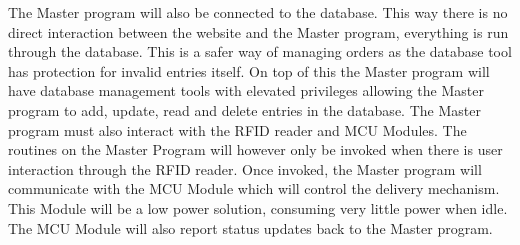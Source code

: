 \documentclass[a4paper,11pt]{article}
\numberwithin{figure}{section}
\numberwithin{table}{section}
\begin{document}
The Master program will also be connected to the database. This way there is no direct interaction between the website and the Master program, everything is run through the database. This is a safer way of managing orders as the database tool has protection for invalid entries itself. On top of this the Master program will have database management tools with elevated privileges allowing the Master program to add, update, read and delete entries in the database. The Master program must also interact with the RFID reader and MCU Modules. The routines on the Master Program will however only be invoked when there is user interaction through the RFID reader. Once invoked, the Master program will communicate with the MCU Module which will control the delivery mechanism. This Module will be a low power solution, consuming very little power when idle. The MCU Module will also report status updates back to the Master program.
\end{document}
